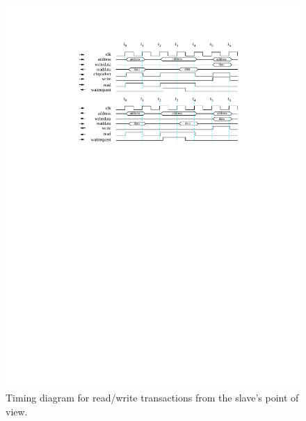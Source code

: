 \documentclass[11pt, twoside, pdftex]{article}
\begin{document}
\begin{figure}[h!]
   \begin{center}
        \includegraphics[scale=1.1]{figures/figure7.pdf}
   \end{center}
   \caption{Timing diagram for read/write transactions from the slave's point of view.}
	\label{fig:7}
\end{figure}
\end{document}

